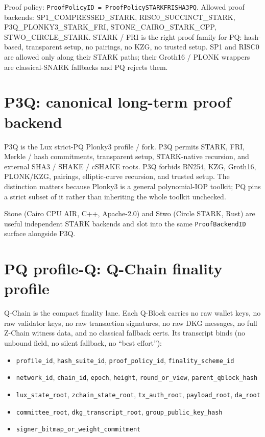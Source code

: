 \documentclass[11pt,a4paper]{article}
\newcommand{\PQ}{\textsf{PQ}}
\begin{document}
\noindent
Proof policy: \texttt{ProofPolicyID = ProofPolicySTARKFRISHA3PQ}.
Allowed proof backends: SP1\_COMPRESSED\_STARK,
RISC0\_SUCCINCT\_STARK, P3Q\_PLONKY3\_STARK\_FRI,
STONE\_CAIRO\_STARK\_CPP, STWO\_CIRCLE\_STARK. STARK / FRI is the
right proof family for \PQ{}: hash-based, transparent setup,
no pairings, no KZG, no trusted setup. SP1 and RISC0 are allowed
only along their STARK paths; their Groth16 / PLONK wrappers are
classical-SNARK fallbacks and \PQ{} rejects them.

\section{P3Q: canonical long-term proof backend}
\label{sec:p3q}

P3Q is the Lux strict-PQ Plonky3 profile / fork. P3Q permits STARK,
FRI, Merkle / hash commitments, transparent setup, STARK-native
recursion, and external SHA3 / SHAKE / cSHAKE roots. P3Q forbids
BN254, KZG, Groth16, PLONK/KZG, pairings, elliptic-curve recursion,
and trusted setup. The distinction matters because Plonky3 is a
general polynomial-IOP toolkit; \PQ{} pins a strict subset of
it rather than inheriting the whole toolkit unchecked.

Stone (Cairo CPU AIR, C++, Apache-2.0) and Stwo (Circle STARK,
Rust) are useful independent STARK backends and slot into the same
\texttt{ProofBackendID} surface alongside P3Q.

\section{PQ profile-Q: Q-Chain finality profile}
\label{sec:pq-q}

Q-Chain is the compact finality lane. Each Q-Block carries no raw
wallet keys, no raw validator keys, no raw transaction signatures,
no raw DKG messages, no full Z-Chain witness data, and no
classical fallback certs. Its transcript binds (no unbound field,
no silent fallback, no ``best effort''):

\begin{itemize}[leftmargin=*, itemsep=0pt]
\item \texttt{profile\_id}, \texttt{hash\_suite\_id},
\texttt{proof\_policy\_id}, \texttt{finality\_scheme\_id}
\item \texttt{network\_id}, \texttt{chain\_id}, \texttt{epoch},
\texttt{height}, \texttt{round\_or\_view},
\texttt{parent\_qblock\_hash}
\item \texttt{lux\_state\_root}, \texttt{zchain\_state\_root},
\texttt{tx\_auth\_root}, \texttt{payload\_root},
\texttt{da\_root}
\item \texttt{committee\_root}, \texttt{dkg\_transcript\_root},
\texttt{group\_public\_key\_hash}
\item \texttt{signer\_bitmap\_or\_weight\_commitment}
\end{itemize}
\end{document}
